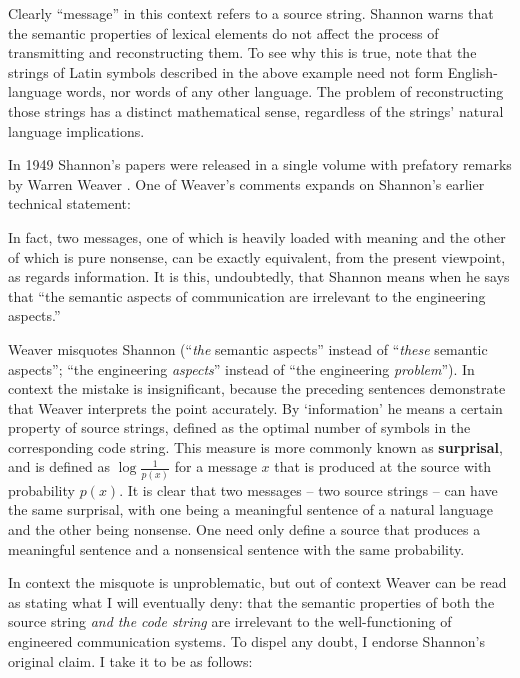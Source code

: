 \noindent Clearly ``message'' in this context refers to a source string.
Shannon warns that the semantic properties of lexical elements do not affect the process of transmitting and reconstructing them.
To see why this is true, note that the strings of Latin symbols described in the above example need not form English-language words, nor words of any other language.
The problem of reconstructing those strings has a distinct mathematical sense, regardless of the strings' natural language implications.

In 1949 Shannon's papers were released in a single volume with prefatory remarks by Warren Weaver \citep{shannon1949mathematical}.
One of Weaver's comments expands on Shannon's earlier technical statement:

\begin{myquote}
In fact, two messages, one of which is heavily loaded with meaning and the other of which is pure nonsense, can be exactly equivalent, from the present viewpoint, as regards information. It is this, undoubtedly, that Shannon means when he says that ``the semantic aspects of communication are irrelevant to the engineering aspects.''
\par\hspace*{\fill}\citet[8]{shannon1949mathematical}
\end{myquote}

\noindent Weaver misquotes Shannon (``\emph{the} semantic aspects'' instead of ``\emph{these} semantic aspects''; ``the engineering \textit{aspects}'' instead of ``the engineering \textit{problem}'').
In context the mistake is insignificant, because the preceding sentences demonstrate that Weaver interprets the point accurately.
By `information' he means a certain property of source strings, defined as the optimal number of symbols in the corresponding code string.
This measure is more commonly known as \textbf{surprisal}, and is defined as $\log{\frac{1}{p(x)}}$ for a message $x$ that is produced at the source with probability $p(x)$.
It is clear that two messages -- two source strings -- can have the same surprisal, with one being a meaningful sentence of a natural language and the other being nonsense.
One need only define a source that produces a meaningful sentence and a nonsensical sentence with the same probability.

In context the misquote is unproblematic, but out of context Weaver can be read as stating what I will eventually deny: that the semantic properties of both the source string \textit{and the code string} are irrelevant to the well-functioning of engineered communication systems.
To dispel any doubt, I endorse Shannon's original claim.
I take it to be as follows:

